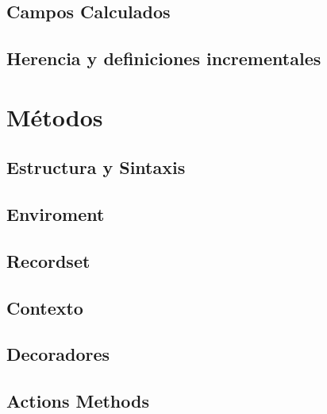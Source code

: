 \documentclass[letterpaper,10pt,spanish]{sphinxmanual}
\begin{document}
\subsection{Campos Calculados}
\label{\detokenize{tecnico/orm-api/campos:campos-calculados}}

\subsection{Herencia y definiciones incrementales}
\label{\detokenize{tecnico/orm-api/campos:herencia-y-definiciones-incrementales}}

\section{Métodos}
\label{\detokenize{tecnico/orm-api/metodos:metodos}}\label{\detokenize{tecnico/orm-api/metodos:id1}}\label{\detokenize{tecnico/orm-api/metodos::doc}}

\subsection{Estructura y Sintaxis}
\label{\detokenize{tecnico/orm-api/metodos:estructura-y-sintaxis}}

\subsection{Enviroment}
\label{\detokenize{tecnico/orm-api/metodos:enviroment}}

\subsection{Recordset}
\label{\detokenize{tecnico/orm-api/metodos:recordset}}

\subsection{Contexto}
\label{\detokenize{tecnico/orm-api/metodos:contexto}}

\subsection{Decoradores}
\label{\detokenize{tecnico/orm-api/metodos:decoradores}}

\subsection{Actions Methods}
\label{\detokenize{tecnico/orm-api/metodos:actions-methods}}
\end{document}
